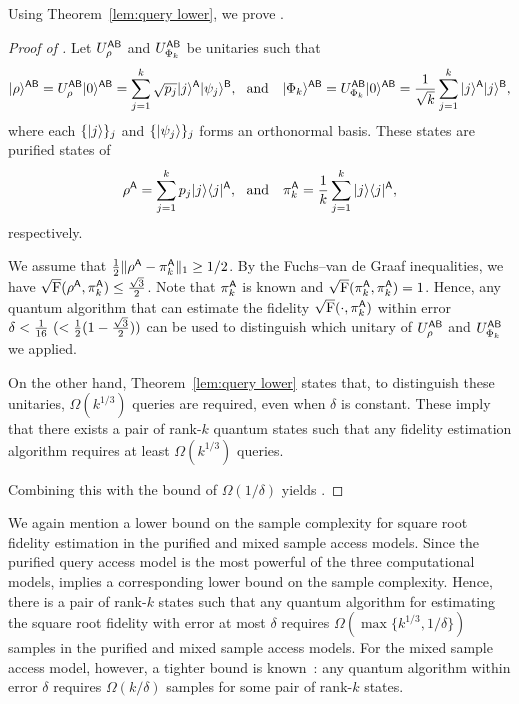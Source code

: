 Using Theorem~\ref{lem:query lower}, we prove .

\begin{proof}[Proof of ]

Let $U_\rho^{{\mathsf{A}}{\mathsf{B}}}$ and $U_{\Phi_k}^{{\mathsf{A}}{\mathsf{B}}}$ be unitaries such that
\begin{align}
    \ket{\rho}^{\sA\sB} = U_\rho^{\sA\sB}\ket{0}^{\sA\sB} = \sum_{j=1}^k \sqrt{p_j} \ket{j}^\sA\ket{\psi_j}^\sB, \ \ \text{and} \ \ \ 
    \ket{\Phi_k}^{\sA\sB} = U_{\Phi_k}^{\sA\sB}\ket{0}^{\sA\sB} = \frac{1}{\sqrt{k}} \sum_{j=1}^k \ket{j}^\sA\ket{j}^\sB,
\end{align}
where each $\{|j\rangle\}_j$ and $\{|\psi_j\rangle\}_j$ forms an orthonormal basis.
These states are purified states of 
\begin{align}
\label{inteq:164}
    \rho^\sA = \sum_{j=1}^k p_j\ketbra{j}{j}^\sA, \ \ \text{and} \ \ \  \pi_k^\sA = \f{1}{k}\sum_{j=1}^k\ketbra{j}{j}^\sA, 
\end{align}
respectively.

We assume that $ \frac{1}{2}\|\rho^{\mathsf{A}} - \pi_k^{{\mathsf{A}}}\|_1 \geq 1/2$.
By the Fuchs–van de Graaf inequalities, we have $\sqrt{{\mathrm{F}}}(\rho^{\mathsf{A}}, \pi_k^{\mathsf{A}}) \leq \frac{\sqrt{3}}{2}$.
Note that $\pi_k^{\mathsf{A}}$ is known and $\sqrt{{\mathrm{F}}}(\pi_k^{\mathsf{A}}, \pi_k^{\mathsf{A}}) = 1$.
Hence, any quantum algorithm that can estimate the fidelity $\sqrt{{\mathrm{F}}}(\cdot, \pi_k^{\mathsf{A}})$ within error $\delta < \frac{1}{16} \ ( < \frac{1}{2}(1-\frac{\sqrt{3}}{2}))$ can be used to distinguish which unitary of $U_\rho^{{\mathsf{A}}{\mathsf{B}}}$ and $U_{\Phi_k}^{{\mathsf{A}}{\mathsf{B}}}$ we applied. 

On the other hand, Theorem~\ref{lem:query lower} states that, to distinguish these unitaries, $\Omega(k^{1/3})$ queries are required, even when $\delta$ is constant.
These imply that there exists a pair of rank-$k$ quantum states such that any fidelity estimation algorithm requires at least $\Omega(k^{1/3})$ queries.


Combining this with the bound of $\Omega(1/\delta)$ yields .
\end{proof}




We again mention a lower bound on the sample complexity for square root fidelity estimation in the purified and mixed sample access models. 
Since the purified query access model is the most powerful of the three computational models, \Cref{prop:lower fidelity est} implies a corresponding lower bound on the sample complexity.
Hence, there is a pair of rank-$k$ states such that any quantum algorithm for estimating the square root fidelity with error at most $\delta$ requires $\Omega(\max\{k^{1/3}, 1/\delta\})$ samples in the purified and mixed sample access models.
For the mixed sample access model, however, a tighter bound is known~\cite{gilyen2022improvedfidelity}: any quantum algorithm within error $\delta$ requires $\Omega(k/\delta)$ samples for some pair of rank-$k$ states.



